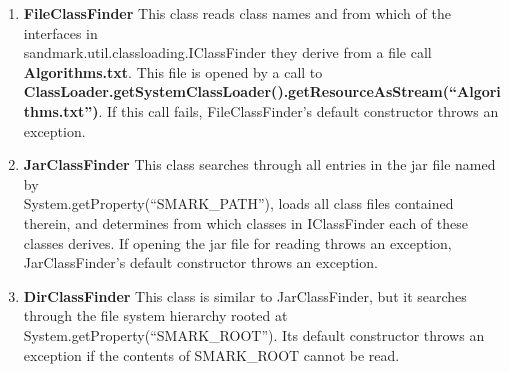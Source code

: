 \begin{enumerate}
\item \textbf{FileClassFinder} This class reads class names and from which 
of the interfaces in \\sandmark.util.classloading.IClassFinder they derive
from a file call \textbf{Algorithms.txt}.  This file is opened by a call to \\
\textbf{ClassLoader.getSystemClassLoader().getResourceAsStream(``Algorithms.txt'')}.
If this call fails, FileClassFinder's default constructor throws an exception.

\item \textbf{JarClassFinder} This class searches through all entries in the
jar file named by \\System.getProperty(``SMARK\_PATH''), 
loads all class files contained therein, and determines from 
which classes in IClassFinder each of these classes derives. If opening
the jar file for reading throws an exception, JarClassFinder's default 
constructor throws an exception.

\item \textbf{DirClassFinder} This class is similar to JarClassFinder, but 
it searches through the file system hierarchy rooted at 
System.getProperty(``SMARK\_ROOT'').  Its default constructor throws an exception
if the contents of SMARK\_ROOT cannot be read.
\end{enumerate}








